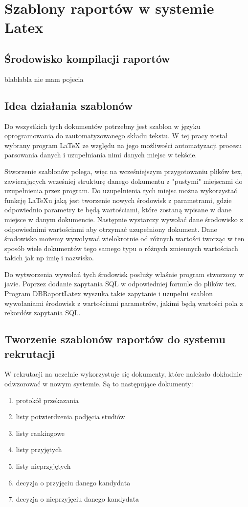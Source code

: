 \chapter{Szablony raportów w systemie Latex}
\label{ch:szablonyraportowwsystemielatex}
\section{Środowisko kompilacji raportów}

blablabla nie mam pojecia

\section{Idea działania szablonów}

Do wszystkich tych dokumentów potrzebny jest szablon w języku oprogramowania do zautomatyzowanego składu tekstu. W tej pracy został wybrany program LaTeX ze względu na jego możliwości automatyzacji procesu parsowania danych i uzupełniania nimi danych miejsc w tekście.
\par Stworzenie szablonów polega, więc na wcześniejszym przygotowaniu plików tex, zawierających wcześniej strukturę danego dokumentu z "pustymi" miejscami do uzupełnienia przez program. Do uzupełnienia tych miejsc można wykorzystać funkcję LaTeXu jaką jest tworzenie nowych środowisk z parametrami, gdzie odpowiednio parametry te będą wartościami, które zostaną wpisane w dane miejsce w danym dokumencie. Następnie wystarczy wywołać dane środowisko z odpowiednimi wartościami aby otrzymać uzupełniony dokument. Dane środowisko możemy wywoływać wielokrotnie od różnych wartości tworząc w ten sposób wiele dokumentów tego samego typu o różnych zmiennych wartościach takich jak np imię i nazwisko. 
\par Do wytworzenia wywołań tych środowisk posłuży właśnie program stworzony w javie. Poprzez dodanie zapytania SQL w odpowiedniej formule do plików tex. Program DBRaportLatex wyszuka takie zapytanie i uzupełni szablon wywołaniami środowisk z wartościami parametrów, jakimi będą wartości pola z rekordów zapytania SQL. 




\section{Tworzenie szablonów raportów do systemu rekrutacji}

W rekrutacji na uczelnie wykorzystuje się dokumenty, które należało dokładnie odwzorować w nowym systemie. Są to następujące dokumenty:\\
\begin{enumerate}
\item protokół przekazania
\item listy potwierdzenia podjęcia studiów 
\item listy rankingowe 
\item listy przyjętych
\item listy nieprzyjętych
\item decyzja o przyjęciu danego kandydata
\item decyzja o nieprzyjęciu danego kandydata \\
\end{enumerate}

